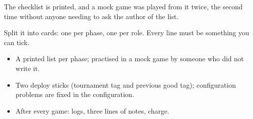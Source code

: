 \begin{checkbox}
The checklist is printed, and a mock game was played from it twice, the second time without anyone needing to ask the author of the list.
\end{checkbox}

\begin{troublebox}
\begin{description}[leftmargin=0.6cm,nosep]
  \item[The list is too long to follow] Split it into cards: one per phase, one per role. Every line must be something you can tick.
\end{description}
\end{troublebox}

\begin{keyidea}
\begin{itemize}[nosep]
  \item A printed list per phase; practised in a mock game by someone who did not write it.
  \item Two deploy sticks (tournament tag and previous good tag); configuration problems are fixed in the configuration.
  \item After every game: logs, three lines of notes, charge.
\end{itemize}
\end{keyidea}
